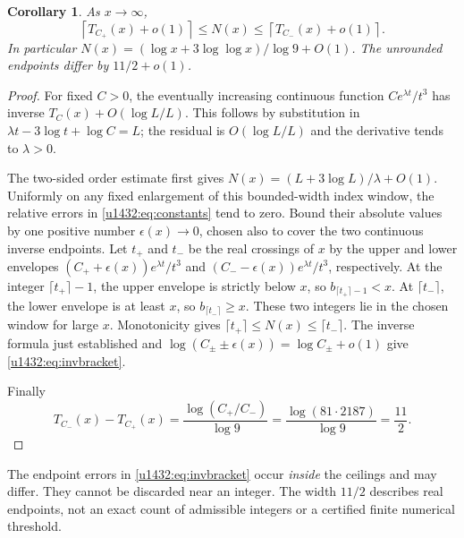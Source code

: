 \documentclass[11pt]{article}
\newtheorem{corollary}[theorem]{Corollary}
\theoremstyle{remark}\newtheorem{remark}[theorem]{Remark}
\begin{document}
\begin{corollary}\label{u1432:cor:inverse}
As $x\to\infty$,
\begin{equation}\label{u1432:eq:invbracket}
 \left\lceil T_{C_+}(x)+o(1)\right\rceil
 \le N(x)\le
 \left\lceil T_{C_-}(x)+o(1)\right\rceil.
\end{equation}
In particular $N(x)=(\log x+3\log\log x)/\log9+O(1)$.
The unrounded endpoints differ by $11/2+o(1)$.
\end{corollary}
\begin{proof}
For fixed $C>0$, the eventually increasing continuous function
$C e^{\lambda t}/t^3$ has inverse
$T_C(x)+O(\log L/L)$. This follows by substitution in
$\lambda t-3\log t+\log C=L$; the residual is $O(\log L/L)$ and the
derivative tends to $\lambda>0$.

The two-sided order estimate first gives
$N(x)=(L+3\log L)/\lambda+O(1)$. Uniformly on any fixed enlargement of
this bounded-width index window, the relative errors in
\eqref{u1432:eq:constants} tend to zero. Bound their absolute values by one
positive number $\epsilon(x)\to0$, chosen also to cover the two
continuous inverse endpoints. Let $t_+$ and $t_-$ be the real crossings of $x$ by the upper and
lower envelopes $(C_++\epsilon(x))e^{\lambda t}/t^3$ and
$(C_--\epsilon(x))e^{\lambda t}/t^3$, respectively. At the integer
$\lceil t_+\rceil-1$, the upper envelope is strictly below $x$, so
$b_{\lceil t_+\rceil-1}<x$. At $\lceil t_-\rceil$, the lower
envelope is at least $x$, so $b_{\lceil t_-\rceil}\ge x$. These two
integers lie in the chosen window for large $x$. Monotonicity gives
$\lceil t_+\rceil\le N(x)\le\lceil t_-\rceil$. The inverse formula just established and
$\log(C_\pm\pm\epsilon(x))=\log C_\pm+o(1)$ give
\eqref{u1432:eq:invbracket}.

Finally
\[
 T_{C_-}(x)-T_{C_+}(x)=\frac{\log(C_+/C_-)}{\log9}
 =\frac{\log(81\cdot2187)}{\log9}=\frac{11}{2}.
\]
\end{proof}
The endpoint errors in \eqref{u1432:eq:invbracket} occur \emph{inside} the
ceilings and may differ. They cannot be discarded near an integer.
The width $11/2$ describes real endpoints, not an exact count of
admissible integers or a certified finite numerical threshold.
\end{document}
